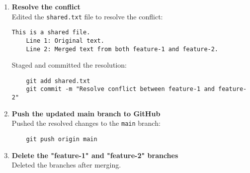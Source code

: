 \documentclass{article}
\begin{document}
\begin{enumerate}
    \item \textbf{Resolve the conflict}\\
    Edited the \texttt{shared.txt} file to resolve the conflict:
    \begin{lstlisting}[language={}]
    This is a shared file.
    Line 1: Original text.
    Line 2: Merged text from both feature-1 and feature-2.
    \end{lstlisting}
    Staged and committed the resolution:
    \begin{lstlisting}
    git add shared.txt
    git commit -m "Resolve conflict between feature-1 and feature-2"
    \end{lstlisting}

    \item \textbf{Push the updated main branch to GitHub}\\
    Pushed the resolved changes to the \texttt{main} branch:
    \begin{lstlisting}
    git push origin main
    \end{lstlisting}

    \item \textbf{Delete the "feature-1" and "feature-2" branches}\\
    Deleted the branches after merging.
\end{enumerate}
\end{document}
